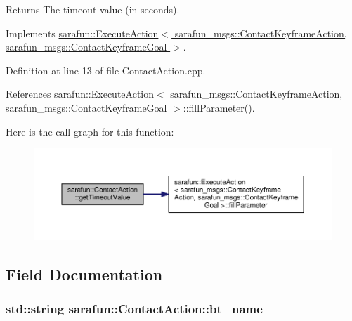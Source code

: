 \begin{DoxyReturn}{Returns}
The timeout value (in seconds). 
\end{DoxyReturn}


Implements \hyperlink{classsarafun_1_1ExecuteAction_aba6cfa8a8ce19e735eb6394424df6d17_aba6cfa8a8ce19e735eb6394424df6d17}{sarafun\-::\-Execute\-Action$<$ sarafun\-\_\-msgs\-::\-Contact\-Keyframe\-Action, sarafun\-\_\-msgs\-::\-Contact\-Keyframe\-Goal $>$}.



Definition at line 13 of file Contact\-Action.\-cpp.



References sarafun\-::\-Execute\-Action$<$ sarafun\-\_\-msgs\-::\-Contact\-Keyframe\-Action, sarafun\-\_\-msgs\-::\-Contact\-Keyframe\-Goal $>$\-::fill\-Parameter().



Here is the call graph for this function\-:
\nopagebreak
\begin{figure}[H]
\begin{center}
\leavevmode
\includegraphics[width=350pt]{dc/d9f/classsarafun_1_1ContactAction_a85d81232d228fc6d2856d318d25c1bf9_a85d81232d228fc6d2856d318d25c1bf9_cgraph}
\end{center}
\end{figure}




\subsection{Field Documentation}
\hypertarget{classsarafun_1_1ContactAction_a71e5d4dc7682ec4dc8ca0b9b83ee214f_a71e5d4dc7682ec4dc8ca0b9b83ee214f}{
\subsubsection[{bt\-\_\-name\-\_\-}]{\setlength{\rightskip}{0pt plus 5cm}std\-::string sarafun\-::\-Contact\-Action\-::bt\-\_\-name\-\_\-\hspace{0.3cm}{\ttfamily [private]}}}\label{classsarafun_1_1ContactAction_a71e5d4dc7682ec4dc8ca0b9b83ee214f_a71e5d4dc7682ec4dc8ca0b9b83ee214f}



